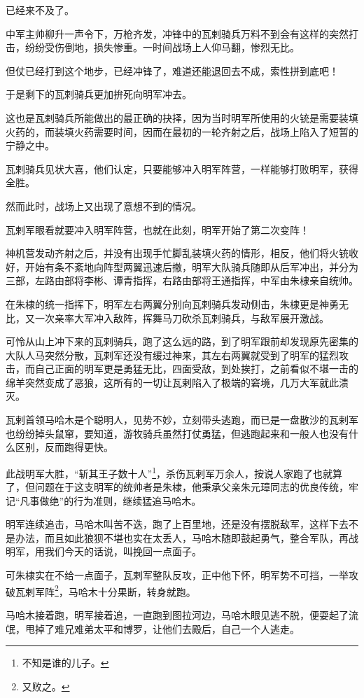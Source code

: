 \begin{multicols}{\theparacolNo}
已经来不及了。

中军主帅柳升一声令下，万枪齐发，冲锋中的瓦剌骑兵万料不到会有这样的突然打击，纷纷受伤倒地，损失惨重。一时间战场上人仰马翻，惨烈无比。

但仗已经打到这个地步，已经冲锋了，难道还能退回去不成，索性拼到底吧！

于是剩下的瓦剌骑兵更加拚死向明军冲去。

这也是瓦剌骑兵所能做出的最正确的抉择，因为当时明军所使用的火铳是需要装填火药的，而装填火药需要时间，因而在最初的一轮齐射之后，战场上陷入了短暂的宁静之中。

瓦剌骑兵见状大喜，他们认定，只要能够冲入明军阵营，一样能够打败明军，获得全胜。

然而此时，战场上又出现了意想不到的情况。

瓦剌军眼看就要冲入明军阵营，也就在此刻，明军开始了第二次变阵！

神机营发动齐射之后，并没有出现手忙脚乱装填火药的情形，相反，他们将火铳收好，开始有条不紊地向阵型两翼迅速后撤，明军大队骑兵随即从后军冲出，并分为三部，左路由部将李彬、谭青指挥，右路由部将王通指挥，中军由朱棣亲自统帅。

在朱棣的统一指挥下，明军左右两翼分别向瓦剌骑兵发动侧击，朱棣更是神勇无比，又一次亲率大军冲入敌阵，挥舞马刀砍杀瓦剌骑兵，与敌军展开激战。

可怜从山上冲下来的瓦剌骑兵，跑了这么远的路，到了明军跟前却发现原先密集的大队人马突然分散，瓦剌军还没有缓过神来，其左右两翼就受到了明军的猛烈攻击，而自己正面的明军更是勇猛无比，四面受敌，到处挨打，之前看似不堪一击的绵羊突然变成了恶狼，这所有的一切让瓦剌陷入了极端的窘境，几万大军就此溃灭。

瓦剌首领马哈木是个聪明人，见势不妙，立刻带头逃跑，而已是一盘散沙的瓦剌军也纷纷掉头鼠窜，要知道，游牧骑兵虽然打仗勇猛，但逃跑起来和一般人也没有什么区别，反而跑得更快。

此战明军大胜，“斩其王子数十人”\footnote{不知是谁的儿子。}，杀伤瓦剌军万余人，按说人家跑了也就算了，但问题在于这支明军的统帅者是朱棣，他秉承父亲朱元璋同志的优良传统，牢记“凡事做绝”的行为准则，继续猛追马哈木。

明军连续追击，马哈木叫苦不迭，跑了上百里地，还是没有摆脱敌军，这样下去不是办法，而且如此狼狈不堪也实在太丢人，马哈木随即鼓起勇气，整合军队，再战明军，用我们今天的话说，叫挽回一点面子。

可朱棣实在不给一点面子，瓦剌军整队反攻，正中他下怀，明军势不可挡，一举攻破瓦剌军阵\footnote{又败之。}，马哈木十分果断，转身就跑。

马哈木接着跑，明军接着追，一直跑到图拉河边，马哈木眼见逃不脱，便耍起了流氓，甩掉了难兄难弟太平和博罗，让他们去殿后，自己一个人逃走。


\end{multicols}
